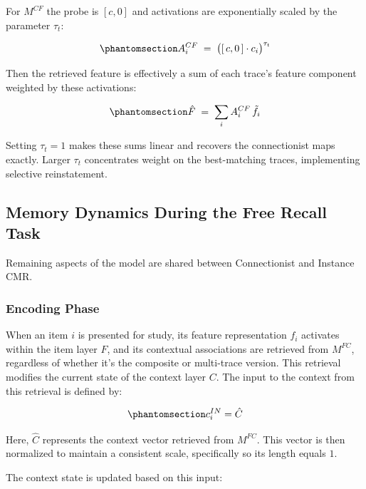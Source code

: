 \documentclass[
  letterpaper,
  11pt,
  english,
  singlespacing,
  headsepline]{MastersDoctoralThesis}
\begin{document}
For \(M^{CF}\) the probe is \([c, 0]\) and activations are exponentially
scaled by the parameter \(\tau_t\):

\begin{equation}\phantomsection\label{eq-10cf}{
A^{CF}_i \;=\; \big([\,c,0\,]\cdot c_i\big)^{\tau_t}
}\end{equation}

Then the retrieved feature is effectively a sum of each trace's feature
component weighted by these activations:

\begin{equation}\phantomsection\label{eq-11cf}{
\hat F \;=\; \sum_i A^{CF}_i\, \tilde f_i
}\end{equation}

Setting \(\tau_t=1\) makes these sums linear and recovers the
connectionist maps exactly. Larger \(\tau_t\) concentrates weight on the
best-matching traces, implementing selective reinstatement.

\subsection{Memory Dynamics During the Free Recall
Task}\label{memory-dynamics-during-the-free-recall-task}

Remaining aspects of the model are shared between Connectionist and
Instance CMR.

\subsubsection{Encoding Phase}\label{encoding-phase}

When an item \(i\) is presented for study, its feature representation
\(f_i\) activates within the item layer \(F\), and its contextual
associations are retrieved from \(M^{FC}\), regardless of whether it's
the composite or multi-trace version. This retrieval modifies the
current state of the context layer \(C\). The input to the context from
this retrieval is defined by:

\begin{equation}\phantomsection\label{eq-12}{
c^{IN}_{i} = \hat{C}
}\end{equation}

Here, \(\hat{C}\) represents the context vector retrieved from
\(M^{FC}\). This vector is then normalized to maintain a consistent
scale, specifically so its length equals \(1\).

The context state is updated based on this input:
\end{document}
